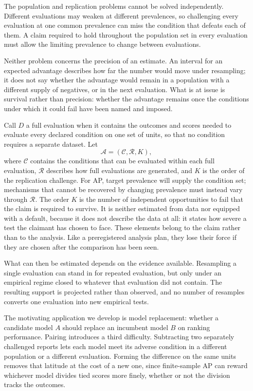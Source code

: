\documentclass[11pt]{article}
\newcommand{\Regime}{\mathcal{R}}
\newcommand{\Assess}{\mathcal{A}}
\newcommand{\CSet}{\mathcal{C}}
\theoremstyle{remark}
\begin{document}
The population and replication problems cannot be solved independently.
Different evaluations may weaken at different prevalences, so challenging every
evaluation at one common prevalence can miss the condition that defeats each of
them. A claim required to hold throughout the population set in every
evaluation must allow the limiting prevalence to change between evaluations.

Neither problem concerns the precision of an estimate. An interval for an
expected advantage describes how far the number would move under resampling; it
does not say whether the advantage would remain in a population with a
different supply of negatives, or in the next evaluation. What is at issue is
survival rather than precision: whether the advantage remains once the
conditions under which it could fail have been named and imposed.

Call $D$ a full evaluation when it contains the outcomes and scores needed to
evaluate every declared condition on one set of units, so that no condition
requires a separate dataset. Let
\[
\Assess=(\CSet,\Regime,K),
\]
where $\CSet$ contains the conditions that can be evaluated within each full
evaluation, $\Regime$ describes how full evaluations are generated, and $K$ is
the order of the replication challenge. For AP, target prevalence will supply
the condition set; mechanisms that cannot be recovered by changing prevalence
must instead vary through $\Regime$. The order $K$ is the number of independent
opportunities to fail that the claim is required to survive. It is neither
estimated from data nor equipped with a default, because it does not describe
the data at all: it states how severe a test the claimant has chosen to face.
These elements belong to the claim rather than to the analysis. Like a
preregistered analysis plan, they lose their force if they are chosen after the
comparison has been seen.

What can then be estimated depends on the evidence available. Resampling a
single evaluation can stand in for repeated evaluation, but only under an
empirical regime closed to whatever that evaluation did not contain. The
resulting support is projected rather than observed, and no number of resamples
converts one evaluation into new empirical tests.

The motivating application we develop is model replacement: whether a candidate
model $A$ should replace an incumbent model $B$ on ranking performance. Pairing
introduces a third difficulty. Subtracting two separately challenged reports
lets each model meet its adverse condition in a different population or a
different evaluation. Forming the difference on the same units removes that
latitude at the cost of a new one, since finite-sample AP can reward whichever
model divides tied scores more finely, whether or not the division tracks the
outcomes.
\end{document}
